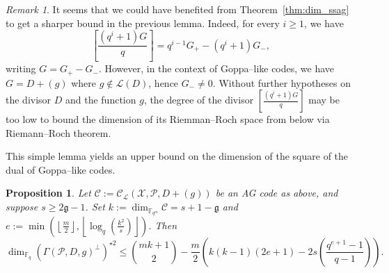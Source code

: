 \documentclass[a4paper]{amsart}
\newtheorem{proposition}[thm]{Proposition}
\theoremstyle{definition}
\theoremstyle{remark}
\newtheorem{remark}[thm]{Remark}
\newcommand{\calP}{\mathcal{P}}
\newcommand{\calL}{\mathcal{L}}
\newcommand{\calC}{\mathcal{C}}
\newcommand{\calX}{\mathcal{X}}
\newcommand{\fqm}{\mathbb{F}_{q^m}}
\newcommand{\fq}{\mathbb{F}_{q}}
\begin{document}
\begin{remark}
	It seems that we could have benefited from Theorem~\ref{thm:dim_ssag} to get a sharper bound in the previous lemma. Indeed, for every $i \geq 1$, we have 
	\[\left[\frac{(q^i+1)G}{q}\right]=q^{i-1}G_+ - (q^i+1)G_-,\]
	writing $G=G_ +-G_-$. However, in the context of Goppa--like codes, we have $G=D+(g)$ where $g \notin \calL(D)$, hence $G_- \neq 0$. Without further hypotheses on the divisor $D$ and the function $g$, the degree of the divisor $\left[\frac{(q^i+1)G}{q}\right]$ may be too low to bound the dimension of its Riemman--Roch space from below via Riemann--Roch theorem.
\end{remark}

This simple lemma yields an upper bound on the dimension of the square of the dual of Goppa--like codes.
\begin{proposition} \label{prop:bound_dim_using_inclusions}
    Let $\calC := \calC_{\calL}(\calX,\calP,D+(g))$ be an AG code as above, and suppose $s \geq 2\mathfrak{g}-1$. Set $k := \dim_{\fqm}\calC = s+1-\mathfrak{g}$ and  $e := \min\left(\left\lfloor \frac{m}{2} \right\rfloor,\left\lfloor \log_q\left(\frac{k^2}{s}\right)\right\rfloor\right)$. Then
    $$\dim_{\fq} (\Gamma(\calP,D,g)^{\perp})^{\star 2} \leq \binom{mk+1}{2} - \dfrac{m}{2}\left(k(k-1)(2e+1)-2s\left(\dfrac{q^{e+1}-1}{q-1}\right)\right).$$
\end{proposition}
\end{document}
